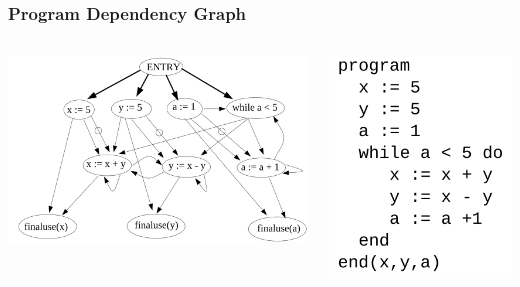 \documentclass[10pt]{beamer}
\begin{document}
\begin{frame}\frametitle{Program Dependency Graph}
	\begin{columns}
		\includegraphics[scale=0.4]{pdg_example.png}
		
		
		\centering
		\includegraphics[scale=0.3]{pdg_example2.png}
		
	\end{columns}
\end{frame}
\end{document}
